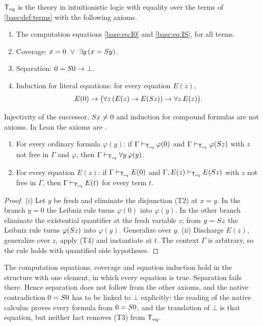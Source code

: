 \begin{definition}[$\Teq$]
\label{base:def:teq}
$\Teq$ is the theory in intuitionistic logic with equality over the terms of
\cref{base:def:terms} with the following axioms.
\begin{enumerate}[label=\textup{(T\arabic*)}]
\item The computation equations \eqref{base:eq:I0} and \eqref{base:eq:IS},
 for all terms.
\item Coverage: $x=0\ \vee\ \exists y\,(x=S y)$.
\item Separation: $0=S 0\to\bot$.
\item Induction for literal equations: for every equation $E(z)$,
 \[
  E(0)\to\bigl(\forall z\,(E(z)\to E(S z))\to\forall z\,E(z)\bigr).
 \]
\end{enumerate}
\end{definition}

Injectivity of the successor, $S x\neq 0$ and induction for compound
formulas are not axioms.  In Lean the axioms are .

\begin{lemma}
\label{base:lem:teqcases}
\begin{enumerate}[label=\textup{(\roman*)}]
\item For every ordinary formula $\varphi(y)$: if
 $\Gamma\vdash_{\mathsf{T}_{\mathrm{eq}}}\varphi(0)$ and
 $\Gamma\vdash_{\mathsf{T}_{\mathrm{eq}}}\varphi(S z)$ with $z$ not free in $\Gamma$ and
 $\varphi$, then $\Gamma\vdash_{\mathsf{T}_{\mathrm{eq}}}\forall y\,\varphi(y)$.
\item For every equation $E(z)$: if $\Gamma\vdash_{\mathsf{T}_{\mathrm{eq}}}E(0)$ and
 $\Gamma,E(z)\vdash_{\mathsf{T}_{\mathrm{eq}}}E(S z)$ with $z$ not free in $\Gamma$, then
 $\Gamma\vdash_{\mathsf{T}_{\mathrm{eq}}}E(t)$ for every term $t$.
\end{enumerate}
\end{lemma}

\begin{proof}
(i) Let $y$ be fresh and eliminate the disjunction (T2) at $x=y$.  In the
branch $y=0$ the Leibniz rule turns $\varphi(0)$ into $\varphi(y)$.  In the
other branch eliminate the existential quantifier at the fresh variable $z$;
from $y=S z$ the Leibniz rule turns $\varphi(S z)$ into $\varphi(y)$.
Generalize over $y$.
(ii) Discharge $E(z)$, generalize over $z$, apply (T4) and instantiate at
$t$.  The context $\Gamma$ is arbitrary, so the rule holds with quantified
side hypotheses.
\end{proof}

\begin{remark}
\label{base:rem:sep}
The computation equations, coverage and equation induction hold in the
structure with one element, in which every equation is true.  Separation
fails there.  Hence separation does not follow from the other axioms, and
the native contradiction $0=S 0$ has to be linked to $\bot$ explicitly:
the reading of the native calculus proves every formula from $0=S 0$,
and the translation of $\bot$ is that equation, but neither fact removes
(T3) from $\Teq$.
\end{remark}

